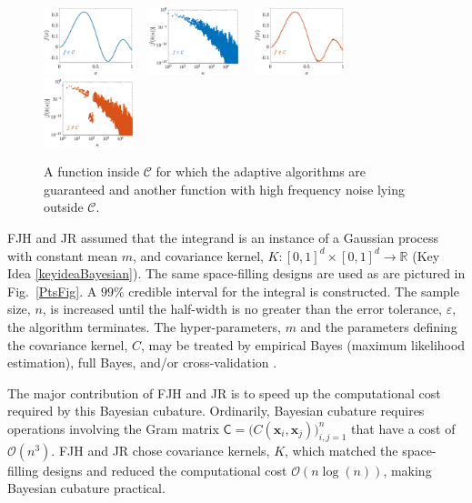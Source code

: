 \documentclass[11pt]{NSFamsart}
\newcommand{\reals}{{\mathbb{R}}}
\newcommand{\mC}{\mathsf{C}}
\newcommand{\bx}{{\boldsymbol{x}}}
\newcommand{\cc}{\mathcal{C}}
\newcommand{\Order}{\mathcal{O}}
\begin{document}
\begin{figure}[h]
	\centering
	\includegraphics[width = 0.23\textwidth] 
	{ProgramsImages/FunctionWalshFourierCoeffDecay.eps} \ \ 
	\includegraphics[width = 0.23\textwidth] 
	{ProgramsImages/WalshFourierCoeffDecay128.eps} \ \ 
	\includegraphics[width = 0.23\textwidth] 
	{ProgramsImages/FilteredFunctionWalshFourierCoeffDecay.eps} \ \ 
	\includegraphics[width = 0.23\textwidth] 
	{ProgramsImages/WalshFourierCoeffDecayFilter.eps}
	\caption{A function inside $\cc$ for which the adaptive algorithms are guaranteed and another function with high frequency noise lying outside $\cc$.
	\label{GoodBadWalshFig}}
\end{figure}

FJH and JR assumed that the integrand is an instance of a Gaussian process with constant mean $m$, and covariance kernel, $K:[0,1]^d \times [0,1]^d \to \reals$ (Key Idea \ref{keyideaBayesian}).  The same space-filling designs are used as are pictured in Fig.\ \ref{PtsFig}.  A $99\%$ credible interval for the integral is constructed.  The sample size, $n$, is increased until the half-width is no greater than the error tolerance, $\varepsilon$, the algorithm terminates.  The hyper-parameters, $m$ and the parameters defining the covariance kernel, $C$, may be treated by empirical Bayes (maximum likelihood estimation), full Bayes, and/or cross-validation \cite{RatHic19a}. 

The major contribution of FJH and JR is to speed up the computational cost required by this Bayesian cubature.  Ordinarily, Bayesian cubature requires operations
involving the Gram matrix $\mC = \bigl(C(\bx_i,\bx_j)\bigr)_{i,j=1}^n$ that have a cost of
$\Order(n^3)$.  FJH and JR chose covariance kernels, $K$, which matched the space-filling designs and reduced the computational cost $\Order(n 
\log(n))$, making Bayesian cubature practical.
\end{document}
